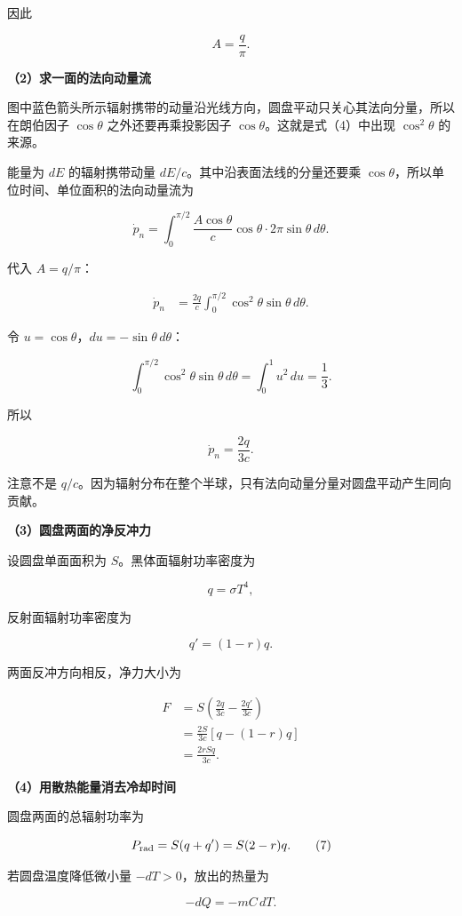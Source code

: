 \documentclass[12pt,a4paper,UTF8]{ctexart}
\begin{document}
因此

\[
A=\frac q\pi.
\tag{3}
\]

\textbf{（2）求一面的法向动量流}

图中蓝色箭头所示辐射携带的动量沿光线方向，圆盘平动只关心其法向分量，所以在朗伯因子
\(\cos\theta\) 之外还要再乘投影因子 \(\cos\theta\)。这就是式（4）中出现
\(\cos^2\theta\) 的来源。

能量为 \(dE\) 的辐射携带动量 \(dE/c\)。其中沿表面法线的分量还要乘
\(\cos\theta\)，所以单位时间、单位面积的法向动量流为

\[
\dot p_n
=\int_0^{\pi/2}
\frac{A\cos\theta}{c}\cos\theta
\cdot2\pi\sin\theta\,d\theta.
\tag{4}
\]

代入 \(A=q/\pi\)：

\[
\begin{aligned}
\dot p_n
&=\frac{2q}{c}
\int_0^{\pi/2}\cos^2\theta\sin\theta\,d\theta.
\end{aligned}
\]

令 \(u=\cos\theta\)，\(du=-\sin\theta\,d\theta\)：

\[
\int_0^{\pi/2}\cos^2\theta\sin\theta\,d\theta
=\int_0^1u^2\,du
=\frac13.
\]

所以

\[
\boxed{\dot p_n=\frac{2q}{3c}}.
\tag{5}
\]

注意不是
\(q/c\)。因为辐射分布在整个半球，只有法向动量分量对圆盘平动产生同向贡献。

\textbf{（3）圆盘两面的净反冲力}

设圆盘单面面积为 \(S\)。黑体面辐射功率密度为

\[
q=\sigma T^4,
\]

反射面辐射功率密度为

\[
q'=(1-r)q.
\]

两面反冲方向相反，净力大小为

\[
\begin{aligned}
F
&=S\left(\frac{2q}{3c}-\frac{2q'}{3c}\right)\\
&=\frac{2S}{3c}\left[q-(1-r)q\right]\\
&=\frac{2rSq}{3c}.
\end{aligned}
\tag{6}
\]

\textbf{（4）用散热能量消去冷却时间}

圆盘两面的总辐射功率为

\[
P_{\rm rad}=S(q+q')=S(2-r)q.
\tag{7}
\]

若圆盘温度降低微小量 \(-dT>0\)，放出的热量为

\[
-dQ=-mC\,dT.
\]
\end{document}
